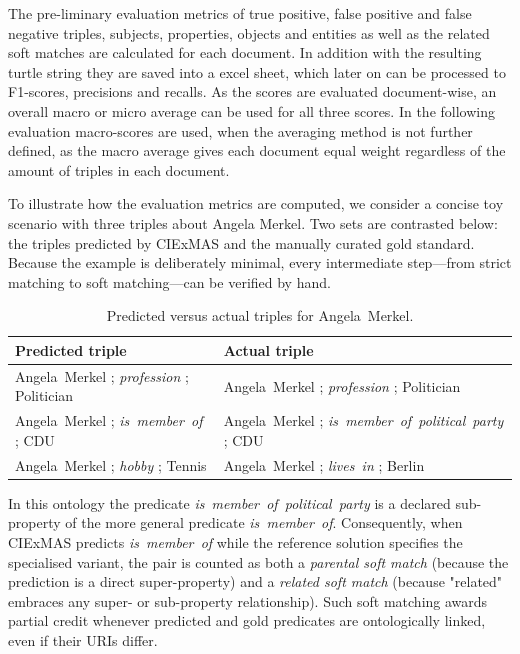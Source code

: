\documentclass[a4paper,oneside,bibliography=totoc]{scrbook}
\begin{document}
The pre-liminary evaluation metrics of true positive, false positive and false negative triples, subjects, properties, objects and entities as well as the related soft matches are calculated for each document. In addition with the resulting turtle string they are saved into a excel sheet, which later on can be processed to F1-scores, precisions and recalls. As the scores are evaluated document-wise, an overall macro or micro average can be used for all three scores. In the following evaluation macro-scores are used, when the averaging method is not further defined, as the macro average gives each document equal weight regardless of the amount of triples in each document.

To illustrate how the evaluation metrics are computed, we consider a concise toy scenario with three triples about Angela Merkel.  Two sets are contrasted below: the triples predicted by CIExMAS and the manually curated gold standard.  Because the example is deliberately minimal, every intermediate step—from strict matching to soft matching—can be verified by hand.

\begin{table}[ht]
  \centering
  \label{tab:merkel_triples}
  \begin{tabular}{p{}p{}}
    \toprule
    \textbf{Predicted triple} & \textbf{Actual triple}                                      \\ \midrule
    Angela~Merkel ; \textit{profession} ; Politician
                              & Angela~Merkel ; \textit{profession} ; Politician            \\[0.2em]
    Angela~Merkel ; \textit{is~member~of} ; CDU
                              & Angela~Merkel ; \textit{is~member~of~political~party} ; CDU \\[0.2em]
    Angela~Merkel ; \textit{hobby} ; Tennis
                              & Angela~Merkel ; \textit{lives~in} ; Berlin                  \\
    \bottomrule
  \end{tabular}
  \caption{Predicted versus actual triples for Angela~Merkel.}
\end{table}

In this ontology the predicate \textit{is~member~of~political~party} is a declared sub-property of the more general predicate \textit{is~member~of}.  Consequently, when CIExMAS predicts \textit{is~member~of} while the reference solution specifies the specialised variant, the pair is counted as both a \emph{parental soft match} (because the prediction is a direct super-property) and a \emph{related soft match} (because "related" embraces any super- or sub-property relationship).  Such soft matching awards partial credit whenever predicted and gold predicates are ontologically linked, even if their URIs differ.
\end{document}
